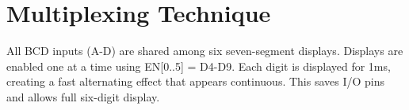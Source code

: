 \section{Multiplexing Technique}
\raggedright
All BCD inputs (A-D) are shared among six seven-segment displays. Displays are enabled one at a time using EN[0..5] = D4-D9. Each digit is displayed for 1ms, creating a fast alternating effect that appears continuous. This saves I/O pins and allows full six-digit display.

